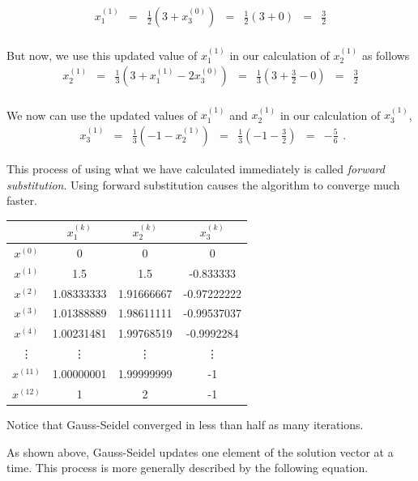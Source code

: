 $$
\begin{matrix}
x^{(1)}_1 & = & \frac{1}{2} ( 3 + x^{(0)}_3)  & = & \frac{1}{2} (3 + 0)     & = & \frac{3}{2} \\
\end{matrix}
$$

But now, we use this updated value of $x^{(1)}_1$ in our calculation of
$x^{(1)}_2$ as follows
$$
\begin{matrix}
x^{(1)}_2 & = & \frac{1}{3} ( 3 + x^{(1)}_1 - 2x^{(0)}_3) & = & \frac{1}{3} (3 + \frac{3}{2} - 0) & = & \frac{3}{2} \\
\end{matrix}
$$

We now can use the updated values of $x^{(1)}_1$ and $x^{(1)}_2$ in our
calculation of $x^{(1)}_3$,
$$
\begin{matrix}
x^{(1)}_3 & = & \frac{1}{3} ( -1 - x^{(1)}_2)       & = & \frac{1}{3} (-1 - \frac{3}{2})    & = & -\frac{5}{6}
\end{matrix}.
$$

This process of using what we have calculated immediately is called
\emph{forward substitution}. Using forward substitution causes the algorithm to
converge much faster.

\begin{center}
    \begin{tabular} {c | c c c}
        & $x^{(k)}_1$ & $x^{(k)}_2$ & $x^{(k)}_3$ \\
        \hline
          $x^{(0)}$ & 0 & 0 & 0 \\
          $x^{(1)}$ & 1.5 & 1.5 & -0.833333 \\
          $x^{(2)}$ & 1.08333333 & 1.91666667 & -0.97222222 \\
          $x^{(3)}$ & 1.01388889 & 1.98611111 & -0.99537037 \\
          $x^{(4)}$ & 1.00231481 & 1.99768519 & -0.9992284 \\
          \vdots    & \vdots    & \vdots     & \vdots     \\
          $x^{(11)}$ & 1.00000001 & 1.99999999 & -1 \\
          $x^{(12)}$ & 1 & 2 & -1 \\
        \end{tabular}
\end{center}
Notice that Gauss-Seidel converged in less than half as many iterations.

As shown above, Gauss-Seidel updates one element of the solution vector at a time.
This process is more generally described by the following equation.


